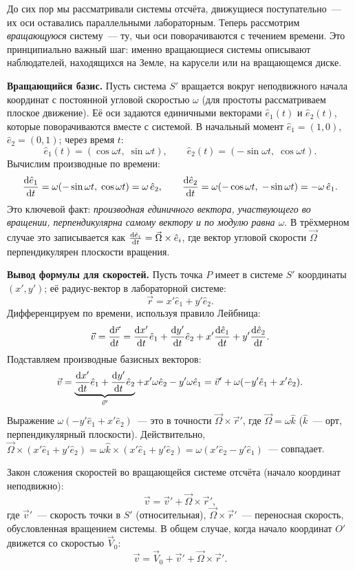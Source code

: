 \documentclass[../main.tex]{subfiles}
\begin{document}
До сих пор мы рассматривали системы отсчёта, движущиеся поступательно~---
их оси оставались параллельными лабораторным. Теперь рассмотрим
\textit{вращающуюся} систему~--- ту, чьи оси поворачиваются с течением времени.
Это принципиально важный шаг: именно вращающиеся системы описывают
наблюдателей, находящихся на Земле, на карусели или на вращающемся
диске.

\noindent\textbf{Вращающийся базис.}
Пусть система $S'$ вращается вокруг неподвижного начала координат
с постоянной угловой скоростью $\omega$ (для простоты рассматриваем плоское
движение). Её оси задаются единичными векторами $\hat{e}_1(t)$
и $\hat{e}_2(t)$, которые поворачиваются вместе
с системой.
В начальный момент $\hat{e}_1 = (1, 0)$, $\hat{e}_2 = (0, 1)$;
через время $t$:
\[
    \hat{e}_1(t) = (\cos\omega t,\; \sin\omega t),
    \qquad
    \hat{e}_2(t) = (-\sin\omega t,\; \cos\omega t).
\]
Вычислим производные по времени:
\[
    \dv{\hat{e}_1}{t} = \omega(-\sin\omega t,\; \cos\omega t) = \omega\,\hat{e}_2,
    \qquad
    \dv{\hat{e}_2}{t} = \omega(-\cos\omega t,\; -\sin\omega t) = -\omega\,\hat{e}_1.
\]
Это ключевой факт: \textit{производная единичного вектора, участвующего
во вращении, перпендикулярна самому вектору и по модулю равна $\omega$}.
В трёхмерном случае это записывается как $\dv{\hat{e}_i}{t} = \vec{\Omega}\times\hat{e}_i$,
где вектор угловой скорости $\vec{\Omega}$ перпендикулярен плоскости вращения.

\noindent\textbf{Вывод формулы для скоростей.}
Пусть точка $P$ имеет в системе $S'$ координаты $(x', y')$;
её радиус-вектор в лабораторной системе:
\[
    \vec{r} = x'\hat{e}_1 + y'\hat{e}_2.
\]
Дифференцируем по времени, используя правило Лейбница:
\[
    \vec{v} = \dv{\vec{r}}{t} = \dv{x'}{t}\hat{e}_1 + \dv{y'}{t}\hat{e}_2
    + x'\dv{\hat{e}_1}{t} + y'\dv{\hat{e}_2}{t}.
\]
Подставляем производные базисных векторов:
\[
    \vec{v} = \underbrace{\dv{x'}{t}\hat{e}_1 + \dv{y'}{t}\hat{e}_2}_{\vec{v}'} +
    x'\omega\hat{e}_2 - y'\omega\hat{e}_1
    = \vec{v}' + \omega(-y'\hat{e}_1 + x'\hat{e}_2).
\]
Выражение $\omega(-y'\hat{e}_1 + x'\hat{e}_2)$~--- это в точности
$\vec{\Omega}\times\vec{r}'$, где $\vec{\Omega} = \omega\hat{k}$
($\hat{k}$~--- орт, перпендикулярный плоскости).
Действительно, $\vec{\Omega}\times(x'\hat{e}_1 + y'\hat{e}_2)
= \omega\hat{k}\times(x'\hat{e}_1 + y'\hat{e}_2)
= \omega(x'\hat{e}_2 - y'\hat{e}_1)$~--- совпадает.

\begin{definition}
Закон сложения скоростей во вращающейся системе отсчёта
(начало координат неподвижно):
\[
    \vec{v} = \vec{v}' + \vec{\Omega}\times\vec{r}',
\]
где $\vec{v}'$~--- скорость точки в $S'$ (относительная),
$\vec{\Omega}\times\vec{r}'$~--- переносная скорость, обусловленная
вращением системы.
В общем случае, когда начало координат $O'$ движется со скоростью $\vec{V}_0$:
\[
    \vec{v} = \vec{V}_0 + \vec{v}' + \vec{\Omega}\times\vec{r}'.
\]
\end{definition}
\end{document}
